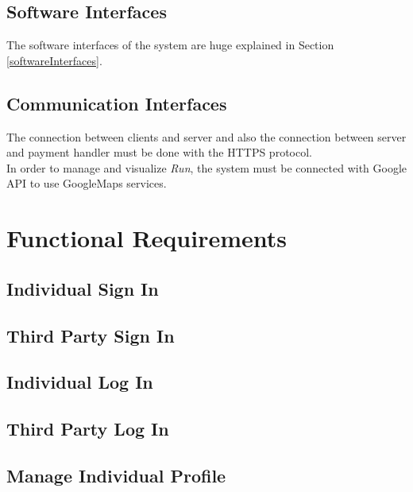 \subsection{Software Interfaces}
The software interfaces of the system are huge explained in Section \ref{softwareInterfaces}.

\subsection{Communication Interfaces}
The connection between clients and server and also the connection between server and payment handler must be done with the HTTPS protocol.\\
In order to manage and visualize \textit{Run}, the system must be connected with Google API to use GoogleMaps services.

\clearpage
\section{Functional Requirements}

\subsection{Individual Sign In}\label{individualLogIn}

\clearpage

\subsection{Third Party Sign In}

\clearpage

\subsection{Individual Log In}

\clearpage

\subsection{Third Party Log In}

\clearpage

\subsection{Manage Individual Profile}

\clearpage

